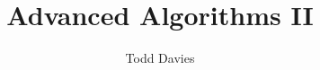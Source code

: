 \newcommand{\coursename}{Advanced Algorithms II}
\newcommand{\coursecode}{COMP36212}
\newcommand{\courseinfo}{}
\newcommand{\Author}{Todd Davies} 
\newcommand{\Title}{Advanced Algorithms II}
\author{\Author}
\title{\Title}
